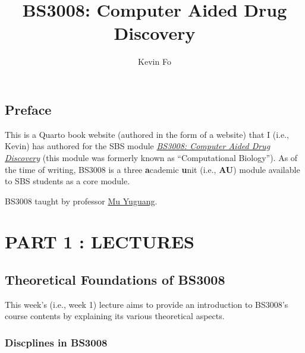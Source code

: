 \documentclass[
  letterpaper,
  DIV=11,
  numbers=noendperiod]{scrreprt}
\title{BS3008: Computer Aided Drug Discovery}
\author{Kevin Fo}
\date{}
\renewcommand*\contentsname{Table of contents}
\newcommand\contentsname{Table of contents}
\begin{document}
\maketitle
\ifdefined\Shaded\renewenvironment{Shaded}{\begin{tcolorbox}[sharp corners, frame hidden, borderline west={3pt}{0pt}{shadecolor}, interior hidden, enhanced, breakable, boxrule=0pt]}{\end{tcolorbox}}\fi

\renewcommand*\contentsname{Table of contents}
{
\hypersetup{linkcolor=}
\setcounter{tocdepth}{2}
\tableofcontents
}

\hypertarget{preface}{%
\chapter*{Preface}\label{preface}}

This is a Quarto book website (authored in the form of a website) that I
(i.e., Kevin) has authored for the SBS module
\href{https://labs.sbs.ntu.edu.sg/obtl/obtl.aspx?sch=sbs\&p=BS3008}{\emph{BS3008:
Computer Aided Drug Discovery}} (this module was formerly known as
``Computational Biology''). As of the time of writing, BS3008 is a three
\textbf{a}cademic \textbf{u}nit (i.e., \textbf{AU}) module available to
SBS students as a core module.

BS3008 taught by professor
\href{https://dr.ntu.edu.sg/cris/rp/rp00074}{Mu Yuguang}.

\part{\textbf{PART 1 : LECTURES}}

\hypertarget{theoretical-foundations-of-bs3008}{%
\chapter{Theoretical Foundations of
BS3008}\label{theoretical-foundations-of-bs3008}}

This week's (i.e., week 1) lecture aims to provide an introduction to
BS3008's course contents by explaining its various theoretical aspects.

\hypertarget{discplines-in-bs3008}{%
\section{Discplines in BS3008}\label{discplines-in-bs3008}}
\end{document}
